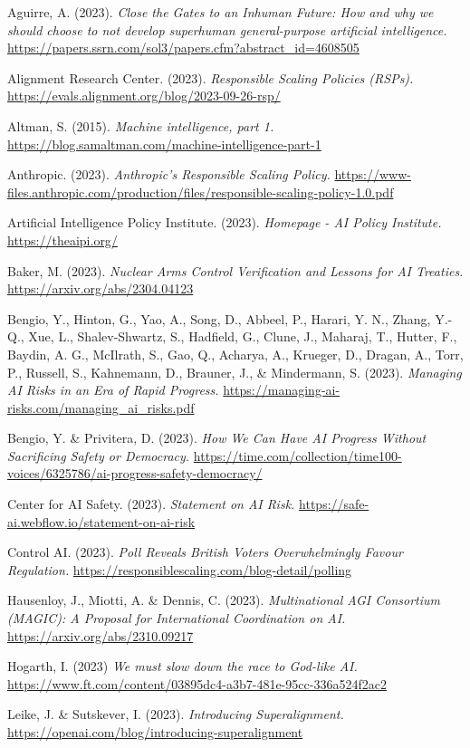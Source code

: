 \documentclass[12pt,a4paper]{article}
\begin{document}
Aguirre, A. (2023). \textit{Close the Gates to an Inhuman Future: How and why we should choose to not develop superhuman general-purpose artificial intelligence.} \url{https://papers.ssrn.com/sol3/papers.cfm?abstract_id=4608505}

Alignment Research Center. (2023). \textit{Responsible Scaling Policies (RSPs).} \url{https://evals.alignment.org/blog/2023-09-26-rsp/}

Altman, S. (2015). \textit{Machine intelligence, part 1.} \url{https://blog.samaltman.com/machine-intelligence-part-1}

Anthropic. (2023). \textit{Anthropic’s Responsible Scaling Policy.} \url{https://www-files.anthropic.com/production/files/responsible-scaling-policy-1.0.pdf}

Artificial Intelligence Policy Institute. (2023). \textit{Homepage - AI Policy Institute.} \url{https://theaipi.org/}

Baker, M. (2023). \textit{Nuclear Arms Control Verification and Lessons for AI Treaties. }\url{https://arxiv.org/abs/2304.04123}

Bengio, Y., Hinton, G., Yao, A., Song, D., Abbeel, P., Harari, Y. N., Zhang, Y.-Q., Xue, L., Shalev-Shwartz, S., Hadfield, G., Clune, J., Maharaj, T., Hutter, F., Baydin, A. G., McIlrath, S., Gao, Q., Acharya, A., Krueger, D., Dragan, A., Torr, P., Russell, S., Kahnemann, D., Brauner, J., \& Mindermann, S. (2023). \textit{Managing AI Risks in an Era of Rapid Progress.} \url{https://managing-ai-risks.com/managing_ai_risks.pdf}

Bengio, Y. \& Privitera, D. (2023). \textit{How We Can Have AI Progress Without Sacrificing Safety or Democracy.} \url{https://time.com/collection/time100-voices/6325786/ai-progress-safety-democracy/}

Center for AI Safety. (2023). \textit{Statement on AI Risk.} \url{https://safe-ai.webflow.io/statement-on-ai-risk}

Control AI. (2023). \textit{Poll Reveals British Voters Overwhelmingly Favour Regulation.} \url{https://responsiblescaling.com/blog-detail/polling}

Hausenloy, J., Miotti, A. \& Dennis, C. (2023). \textit{Multinational AGI Consortium (MAGIC): A Proposal for International Coordination on AI.} \url{https://arxiv.org/abs/2310.09217}

Hogarth, I. (2023) \textit{We must slow down the race to God-like AI.} \url{https://www.ft.com/content/03895dc4-a3b7-481e-95cc-336a524f2ac2}

Leike, J. \& Sutskever, I. (2023). \textit{Introducing Superalignment. }\url{https://openai.com/blog/introducing-superalignment}
\end{document}
